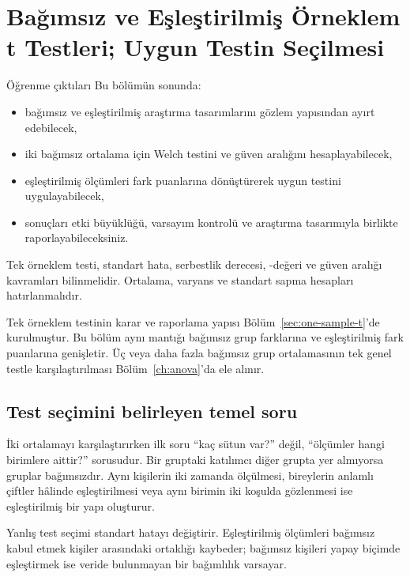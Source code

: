 \chapter{Bağımsız ve Eşleştirilmiş Örneklem t Testleri; Uygun Testin Seçilmesi}
\label{ch:two-sample}

\begin{prismbox}[PrismLight]{Öğrenme çıktıları}
Bu bölümün sonunda:
\begin{itemize}
  \item bağımsız ve eşleştirilmiş araştırma tasarımlarını gözlem yapısından ayırt edebilecek,
  \item iki bağımsız ortalama için Welch \tstat testini ve güven aralığını hesaplayabilecek,
  \item eşleştirilmiş ölçümleri fark puanlarına dönüştürerek uygun \tstat testini uygulayabilecek,
  \item sonuçları etki büyüklüğü, varsayım kontrolü ve araştırma tasarımıyla birlikte raporlayabileceksiniz.
\end{itemize}
\end{prismbox}

\begin{prerequisitebox}
Tek örneklem \tstat testi, standart hata, serbestlik derecesi, \pval-değeri ve güven
aralığı kavramları bilinmelidir. Ortalama, varyans ve standart sapma
hesapları hatırlanmalıdır.
\end{prerequisitebox}

Tek örneklem testinin karar ve raporlama yapısı Bölüm~\ref{sec:one-sample-t}'de
kurulmuştur. Bu bölüm aynı mantığı bağımsız grup farklarına ve eşleştirilmiş
fark puanlarına genişletir.
\ifimoders\else
Üç veya daha fazla bağımsız grup ortalamasının
tek genel testle karşılaştırılması Bölüm~\ref{ch:anova}'da ele alınır.
\fi

\section{Test seçimini belirleyen temel soru}
\label{sec:t-test-choice}

İki ortalamayı karşılaştırırken ilk soru ``kaç sütun var?'' değil,
``ölçümler hangi birimlere aittir?'' sorusudur. Bir gruptaki katılımcı diğer
grupta yer almıyorsa gruplar bağımsızdır. Aynı kişilerin iki zamanda
ölçülmesi, bireylerin anlamlı çiftler hâlinde eşleştirilmesi veya aynı birimin
iki koşulda gözlenmesi ise eşleştirilmiş bir yapı oluşturur.

Yanlış test seçimi standart hatayı değiştirir. Eşleştirilmiş ölçümleri
bağımsız kabul etmek kişiler arasındaki ortaklığı kaybeder; bağımsız kişileri
yapay biçimde eşleştirmek ise veride bulunmayan bir bağımlılık varsayar.

